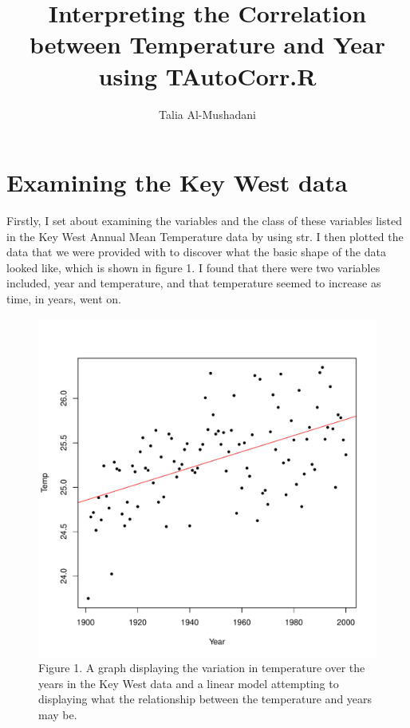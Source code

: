 \documentclass[12pt]{article}
\title{Interpreting the Correlation between Temperature and Year using TAutoCorr.R}
\author{Talia Al-Mushadani}
\date{}
\begin{document}
    \maketitle

    \section{Examining the Key West data}
    Firstly, I set about examining the variables and the class of these variables 
    listed in the Key West Annual Mean Temperature data by using str.
    I then plotted the data that we were provided with to discover what the 
    basic shape of the data looked like, which is shown in figure 1. 
    I found that there were two variables included, year and temperature, 
    and that temperature seemed to increase as time, in years, went on.
    
    \begin{figure}
        \includegraphics[width = 1\textwidth]{KeyWestScatter.pdf}
        \caption{Figure 1. A graph displaying the variation in temperature 
        over the years in the Key West data and a linear model attempting to displaying
        what the relationship between the temperature and years may be.}
    \end{figure}
\end{document}
